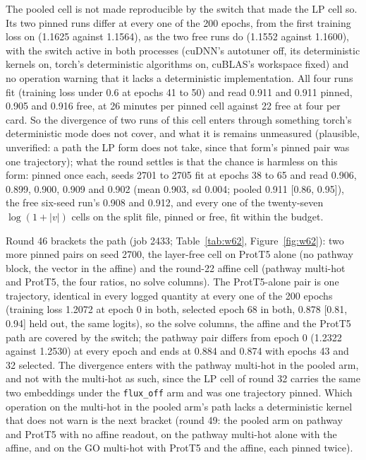 The pooled cell is not made reproducible by the switch that made the LP cell so. Its
two pinned runs differ at every one of the 200 epochs, from the first training loss
on (1.1625 against 1.1564), as the two free runs do (1.1552 against 1.1600), with the
switch active in both processes (cuDNN's autotuner off, its deterministic kernels
on, torch's deterministic algorithms on, cuBLAS's workspace fixed) and no operation
warning that it lacks a deterministic implementation. All four runs fit (training loss
under 0.6 at epochs 41 to 50) and read 0.911 and 0.911 pinned, 0.905 and 0.916 free,
at 26 minutes per pinned cell against 22 free at four per card. So the divergence of
two runs of this cell enters through something torch's deterministic mode does not
cover, and what it is remains unmeasured (plausible, unverified: a path the LP form
does not take, since that form's pinned pair was one trajectory); what the round
settles is that the chance is harmless on this form: pinned once each, seeds 2701 to
2705 fit at epochs 38 to 65 and read 0.906, 0.899, 0.900, 0.909 and 0.902 (mean
0.903, sd 0.004; pooled 0.911 [0.86, 0.95]), the free six-seed run's 0.908 and 0.912,
and every one of the twenty-seven $\log(1 + |v|)$ cells on the split file, pinned or
free, fit within the budget.

Round 46 brackets the path (job 2433; Table~\ref{tab:w62},
Figure~\ref{fig:w62}): two more pinned pairs on seed 2700, the layer-free cell on
ProtT5 alone (no pathway block, the vector in the affine) and the round-22 affine cell
(pathway multi-hot and ProtT5, the four ratios, no solve columns). The ProtT5-alone
pair is one trajectory, identical in every logged quantity at every one of the 200
epochs (training loss 1.2072 at epoch 0 in both, selected epoch 68 in both, 0.878
[0.81, 0.94] held out, the same logits), so the solve columns, the affine and the
ProtT5 path are covered by the switch; the pathway pair differs from epoch 0 (1.2322
against 1.2530) at every epoch and ends at 0.884 and 0.874 with epochs 43 and 32
selected. The divergence enters with the pathway multi-hot in the pooled arm, and not
with the multi-hot as such, since the LP cell of round 32 carries the same two
embeddings under the \texttt{flux\_off} arm and was one trajectory pinned. Which
operation on the multi-hot in the pooled arm's path lacks a deterministic kernel that
does not warn is the next bracket (round 49: the pooled arm on pathway and ProtT5 with
no affine readout, on the pathway multi-hot alone with the affine, and on the GO
multi-hot with ProtT5 and the affine, each pinned twice).

